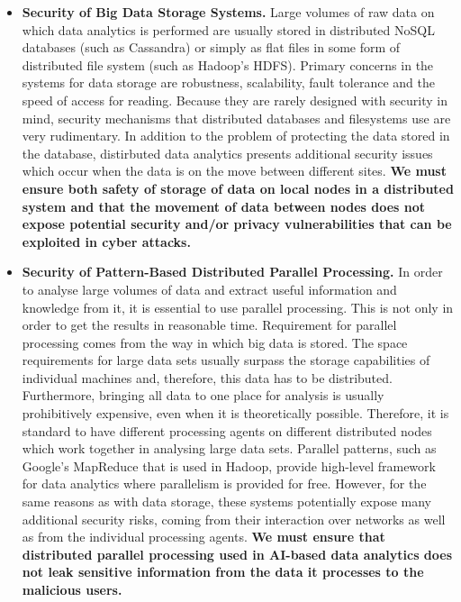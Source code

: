 \documentclass[a4paper,11pt]{article}
\begin{document}
\begin{itemize}
\item \textbf{Security of Big Data Storage Systems.} Large volumes of raw data on which data analytics is performed are usually stored in distributed NoSQL databases (such as Cassandra) or simply as flat files in some form of distributed file system (such as Hadoop's HDFS). Primary concerns in the systems for data storage are robustness, scalability, fault tolerance and the speed of access for reading. Because they are rarely designed with security in mind, security mechanisms that distributed databases and filesystems use are very rudimentary. In addition to the problem of protecting the data stored in the database, distirbuted data analytics presents additional security issues which occur when the data is on the move between different sites. \textbf{We must ensure both safety of storage of data on local nodes in a distributed system and that the movement of data between nodes does not expose potential security and/or privacy vulnerabilities that can be exploited in cyber attacks.}

\item \textbf{Security of Pattern-Based Distributed Parallel Processing.} In order to analyse large volumes of data and extract useful information and knowledge from it, it is essential to use parallel processing. This is not only in order to get the results in reasonable time. Requirement for parallel processing comes from the way in which big data is stored. The space requirements for large data sets usually surpass the storage capabilities of individual machines and, therefore, this data has to be distributed. Furthermore, bringing all data to one place for analysis is usually prohibitively expensive, even when it is theoretically possible. Therefore, it is standard to have different processing agents on different distributed nodes which work together in analysing large data sets. Parallel patterns, such as Google's MapReduce that is used in Hadoop, provide high-level framework for data analytics where parallelism is provided for free. However, for the same reasons as with data storage, these systems potentially expose many additional security risks, coming from their interaction over networks as well as from the individual processing agents. \textbf{We must ensure that distributed parallel processing used in AI-based data analytics does not leak sensitive information from the data it processes to the malicious users.}


\end{itemize}
\end{document}
